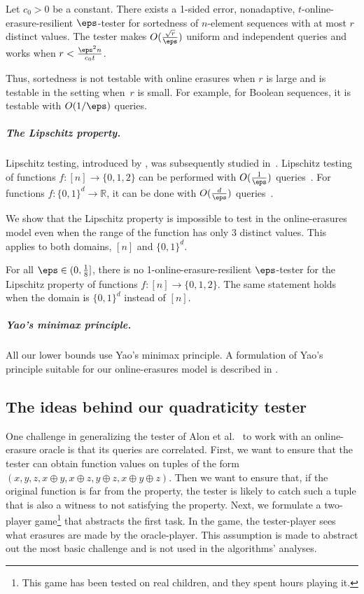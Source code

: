 \documentclass{toc}
\begin{document}
\begin{theorem}\label{thm:sortedness_uniform}
Let $c_0 > 0$ be a constant.
There exists a 1-sided error, nonadaptive, $t$-online-erasure-resilient $\eps$-tester for sortedness of $n$-element sequences with at most $r$ distinct values. The tester makes $O(\frac{\sqrt{r}}{\eps})$ uniform and independent queries and works when $r<\frac{\eps^2 n}{c_0 t}$.
\end{theorem}

Thus, sortedness is not testable with online erasures when $r$ is large and is testable in the setting when~$r$ is small. For example, for Boolean sequences, it is testable with $O(1/\eps)$ queries.



\subparagraph*{The Lipschitz property.} Lipschitz testing, introduced by \cite{JhaR13}, was subsequently studied in~\cite{CS13, DixitJRT13, BermanRY14, AwasthiJMR16, ChakrabartyDJS17}. Lipschitz testing of functions %
$f:[n]\to\{0,1,2\}$ can be performed with $O(\frac 1\eps)$ queries~\cite{JhaR13}. For functions $f:\{0,1\}^d\to\mathbb{R}$, it can be done with $O(\frac d\eps)$ queries~\cite{JhaR13,CS13}. 

We show that the Lipschitz property is impossible to test in the online-erasures model even when the range of the function has only 3 distinct values. This applies to both domains, $[n]$ and $\{0,1\}^d.$
 

\begin{theorem}\label{thm:lipschitz}
    For all $\eps \in (0, \frac{1}{8}]$,
    there is no 1-online-erasure-resilient $\eps$-tester for
    the Lipschitz property of functions $f \colon [n] \to \{0,1,2\}$. 
    The same statement holds when the domain is $\{0,1\}^d$ instead of $[n].$
\end{theorem}


\subparagraph*{Yao's minimax principle.} All our lower bounds use Yao's minimax principle. A formulation of Yao's principle suitable for our online-erasures model 
is described in . 


%
\subsection{The ideas behind our quadraticity tester}\label{sec:techniques}
 One challenge in generalizing
the tester
of Alon et al.~\cite{AlonKKLR05} to work with an online-erasure oracle is that 
%
its queries are correlated. First, we want to ensure that the tester can obtain function values on tuples of the %
form
%
$(x,y,z,x\oplus y, x\oplus z, y\oplus z, x\oplus y \oplus z)$. %
Then  we  want to ensure that, if the original function is far from the property, the tester is likely to catch such a tuple that is also a witness to not satisfying the property. Next, we formulate a two-player game\footnote{This game has been tested on real children, and they spent hours playing it.} that abstracts the first task. 
In the game, the tester-player sees what erasures are made by the oracle-player. This assumption is made to abstract out the most basic challenge and is not used in the algorithms' analyses.
\end{document}
